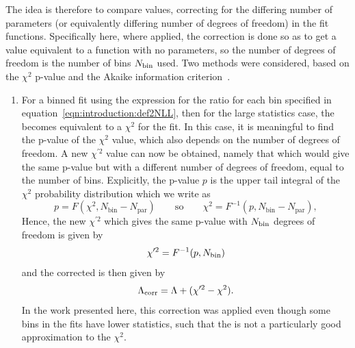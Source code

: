 The idea is therefore to compare \nll values,
correcting for the differing number of parameters
(or equivalently differing number of degrees of freedom) in
the fit functions. Specifically here, where applied, the correction is
done so as to get a value equivalent to a function with no parameters, so
the number of degrees of freedom is the number of bins $N_{\rm bin}$ used.
Two methods were considered, based on the
$\chi^2$ p-value and the Akaike information
criterion~\cite{ref:correction:akaike}.
\begin{enumerate}
\item %
For a binned fit using the expression for the \nll ratio
for each bin specified in equation~\ref{eqn:introduction:def2NLL}, then for
the large statistics case, the \nll becomes equivalent to a $\chi^2$ for the
fit. In this case, it is meaningful to find the p-value of the $\chi^2$ value,
which also depends on the number of degrees of freedom.
A new $\chi^{\prime 2}$
value can now be obtained, namely that which would give the same p-value but
with a different number of degrees of freedom,
equal to the number of bins.
Explicitly, the p-value $p$ is the upper
tail integral of the $\chi^2$ probability
distribution which we write as
\begin{displaymath}
p = F(\chi^2,N_{\mathrm{bin}}-N_{\mathrm{par}})\qquad\mathrm{so}\qquad
\chi^2 = F^{-1}(p,N_{\mathrm{bin}}-N_{\mathrm{par}}),
\end{displaymath}
Hence, the new $\chi^{\prime 2}$ which gives the same p-value with
$N_{\rm bin}$ degrees of freedom is given by
\begin{displaymath}
\chi^{\prime 2} = F^{-1}(p,N_{\rm bin})
\end{displaymath}
and the corrected \nll is then given by
\begin{displaymath}
\Lambda_{\mathrm{corr}} = \textrm{\ensuremath{\Lambda}} + (\chi^{\prime 2} - \chi^2).
\end{displaymath}
In the work presented here,
this correction was applied even though some bins in the fits
have lower statistics,
such that the \nll is not a particularly good approximation to the $\chi^2$.


\end{enumerate}
